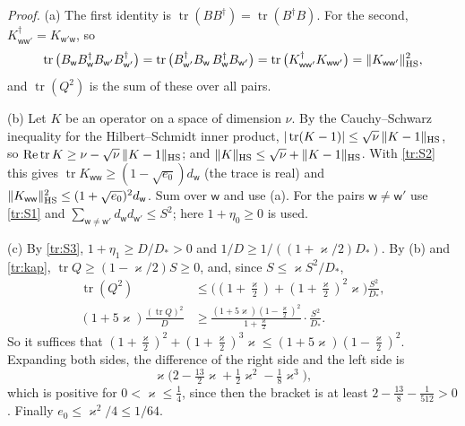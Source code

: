 \documentclass[11pt,letterpaper]{article}
\newcommand{\re}{\operatorname{Re}}
\begin{document}
\emph{Proof.} (a) The first identity is $\operatorname{tr}(BB^\dagger)=\operatorname{tr}(B^\dagger B)$. For the
second, $K_{\mathsf w\mathsf w'}^\dagger=K_{\mathsf w'\mathsf w}$, so
\begin{equation}\label{D:306}
 \operatorname{tr}\big(B_{\mathsf w}B_{\mathsf w}^\dagger B_{\mathsf w'}B_{\mathsf w'}^\dagger\big)
 =\operatorname{tr}\big(B_{\mathsf w'}^\dagger B_{\mathsf w}\,B_{\mathsf w}^\dagger B_{\mathsf w'}\big)
 =\operatorname{tr}\big(K_{\mathsf w\mathsf w'}^\dagger K_{\mathsf w\mathsf w'}\big)
 =\|K_{\mathsf w\mathsf w'}\|_{\rm HS}^2 ,
\end{equation}
and $\operatorname{tr}(Q^2)$ is the sum of these over all pairs.

(b) Let $K$ be an operator on a space of dimension $\nu$. By the Cauchy--Schwarz inequality for the
Hilbert--Schmidt inner product, $|\operatorname{tr}(K-1)|\le\sqrt\nu\,\|K-1\|_{\rm HS}$, so
$\re\operatorname{tr}K\ge\nu-\sqrt\nu\,\|K-1\|_{\rm HS}$; and $\|K\|_{\rm HS}\le\sqrt\nu+\|K-1\|_{\rm HS}$. With
\eqref{tr:S2} this gives $\operatorname{tr}K_{\mathsf w\mathsf w}\ge(1-\sqrt{e_0})d_{\mathsf w}$ (the trace is
real) and $\|K_{\mathsf w\mathsf w}\|_{\rm HS}^2\le(1+\sqrt{e_0})^2d_{\mathsf w}$. Sum over $\mathsf w$ and use
(a). For the pairs $\mathsf w\ne\mathsf w'$ use \eqref{tr:S1} and
$\sum_{\mathsf w\ne\mathsf w'}d_{\mathsf w}d_{\mathsf w'}\le S^2$; here $1+\eta_0\ge0$ is used.

(c) By \eqref{tr:S3}, $1+\eta_1\ge D/D_*>0$ and $1/D\ge1/((1+\varkappa/2)D_*)$. By (b) and \eqref{tr:kap},
$\operatorname{tr}Q\ge(1-\varkappa/2)S\ge0$, and, since $S\le\varkappa S^2/D_*$,
\begin{align}\label{D:307}
 \operatorname{tr}(Q^2)&\le\Big((1+\tfrac\varkappa2)+(1+\tfrac\varkappa2)^2\varkappa\Big)\frac{S^2}{D_*},\\
 (1+5\varkappa)\frac{(\operatorname{tr}Q)^2}{D}&\ge\frac{(1+5\varkappa)(1-\frac\varkappa2)^2}{1+\frac\varkappa2}\cdot\frac{S^2}{D_*}.
\end{align}
So it suffices that $(1+\frac\varkappa2)^2+(1+\frac\varkappa2)^3\varkappa\le(1+5\varkappa)(1-\frac\varkappa2)^2$.
Expanding both sides, the difference of the right side and the left side is
\begin{equation}\label{tr:poly}
 \varkappa\big(2-\tfrac{13}2\varkappa+\tfrac12\varkappa^2-\tfrac18\varkappa^3\big),
\end{equation}
which is positive for $0<\varkappa\le\frac14$, since then the bracket is at least $2-\frac{13}8-\frac1{512}>0$.
Finally $e_0\le\varkappa^2/4\le1/64$.
\end{document}
